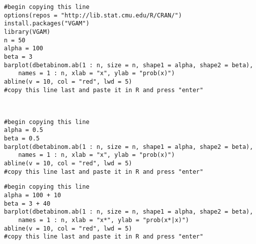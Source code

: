 \documentclass[12pt]{article}
\begin{document}

\begin{enumerate}





\begin{verbatim}
#begin copying this line
options(repos = "http://lib.stat.cmu.edu/R/CRAN/")
install.packages("VGAM")
library(VGAM)
n = 50
alpha = 100
beta = 3
barplot(dbetabinom.ab(1 : n, size = n, shape1 = alpha, shape2 = beta), 
	names = 1 : n, xlab = "x", ylab = "prob(x)")
abline(v = 10, col = "red", lwd = 5)
#copy this line last and paste it in R and press "enter"
\end{verbatim}~  


\begin{verbatim}
#begin copying this line
alpha = 0.5
beta = 0.5
barplot(dbetabinom.ab(1 : n, size = n, shape1 = alpha, shape2 = beta), 
	names = 1 : n, xlab = "x", ylab = "prob(x)")
abline(v = 10, col = "red", lwd = 5)
#copy this line last and paste it in R and press "enter"
\end{verbatim}



\begin{verbatim}
#begin copying this line
alpha = 100 + 10
beta = 3 + 40
barplot(dbetabinom.ab(1 : n, size = n, shape1 = alpha, shape2 = beta), 
	names = 1 : n, xlab = "x*", ylab = "prob(x*|x)")
abline(v = 10, col = "red", lwd = 5)
#copy this line last and paste it in R and press "enter"
\end{verbatim} ~


\end{enumerate}
\end{document}
